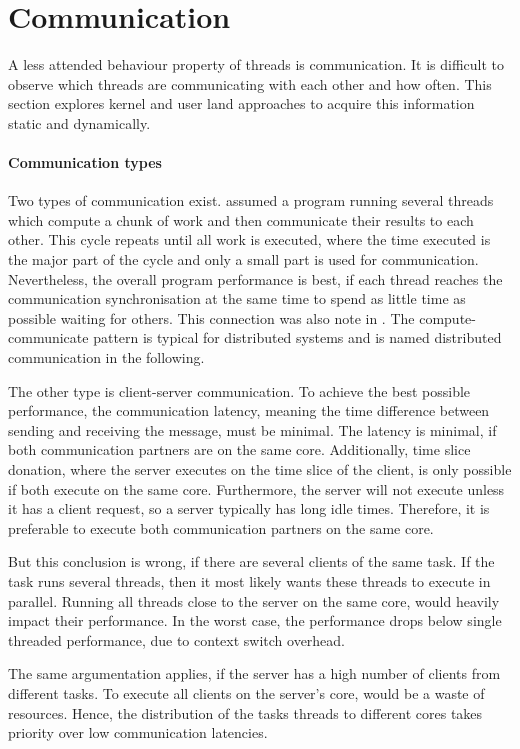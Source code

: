 \section{Communication}
\label{design:comm}

A less attended behaviour property of threads is communication.
It is difficult to observe which threads are communicating with each other and
how often.
This section explores kernel and user land approaches to acquire this
information static and dynamically.


\paragraph{Communication types}
Two types of communication exist.
\citeauthor{hofmeyr_load_2010} assumed a program running several threads which
compute a chunk of work and then communicate their results to each other.
This cycle repeats until all work is executed, where the time executed is the
major part of the cycle and only a small part is used for communication.
Nevertheless, the overall program performance is best, if each thread reaches
the communication synchronisation at the same time to spend as little time as
possible waiting for others.
This connection was also note in \cite{hofmeyr_load_2010}.
The compute-communicate pattern is typical for distributed systems and is named
distributed communication in the following.

The other type is client-server communication.
To achieve the best possible performance, the communication latency, meaning
the time difference between sending and receiving the message, must be minimal.
The latency is minimal, if both communication partners are on the same core.
Additionally, time slice donation, where the server executes on the time slice
of the client, is only possible if both execute on the same core.
Furthermore, the server will not execute unless it has a client request, so a
server typically has long idle times.
Therefore, it is preferable to execute both communication partners on the same
core.

But this conclusion is wrong, if there are several clients of the same task.
If the task runs several threads, then it most likely wants these threads to
execute in parallel.
Running all threads close to the server on the same core, would heavily impact
their performance.
In the worst case, the performance drops below single threaded performance, due
to context switch overhead.

The same argumentation applies, if the server has a high number of clients from
different tasks.
To execute all clients on the server's core, would be a waste of resources.
Hence, the distribution of the tasks threads to different cores takes priority
over low communication latencies.


